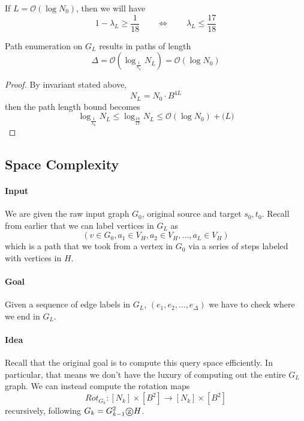 \documentclass[11pt, letter]{book}
\newcommand*\tcircle[1]{%
  \raisebox{-0.5pt}{%
    \textcircled{#1}%
  }%
}
\begin{document}
\begin{proposition} 
If $L = \mathcal O (\log N_0 )$, then we will have 
\begin{equation}
	1 - \lambda_L \geq \frac{1}{18} \quad \quad \iff 
	\quad \quad \lambda_L \leq \frac{17}{18}
\end{equation}	
\end{proposition}

\begin{proposition}
	Path enumeration on $G_L$ results in paths of length 
	\begin{equation}
		\Delta = \mathcal O \left( \log _{\frac{1}{\lambda_L}} N_L \right) = \mathcal O \left( \log N_0 \right)
	\end{equation}
\end{proposition}
\begin{proof}
	By invariant stated above, 
	\begin{equation}
		N_L = N_0 \cdot B^{4L}
	\end{equation}
	then the path length bound becomes
	\begin{equation}
		\log _{\frac{1}{\lambda_L}} N_L \leq \log_{\frac{18}{17}} N_L \leq \mathcal O( \log N_0 ) + \mathcal (L )
	\end{equation}
\end{proof}


\subsection{Space Complexity}
\paragraph{Input} We are given the raw input graph $G_0$, original source and target $s_0, t_0$. Recall from earlier that we can label vertices in $G_L$ as
\begin{equation}
	(v\in G_0, a_1 \in V_H, a_2 \in V_H, \dots, a_L \in V_H)
\end{equation}
which is a path that we took from a vertex in $G_0$ via a series of steps labeled with vertices in $H$. 

\paragraph{Goal} Given a sequence of edge labels in $G_L$, 
$
	(e_1, e_2, \dots, e_\Delta)
$
we have to check where we end in $G_L$. 

\paragraph{Idea}
Recall that the original goal is to compute this query space efficiently. In particular, that means we don't have the luxury of computing out the entire $G_L$ graph. We can instead compute the rotation maps 
\begin{equation}
	Rot_{G_k}: [N_k] \times [B^2] \rightarrow [N_k] \times [B^2]
\end{equation}
recursively, following $G_k = G^2_{k - 1} \tcircle {z} H$. 
\end{document}
